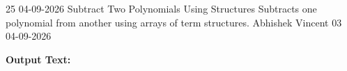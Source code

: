 \clearpage
\label{prog:25}
\programhead
  {25}
  {04-09-2026}
  {Subtract Two Polynomials Using Structures}
  {Subtracts one polynomial from another using arrays of term structures.}
  {Abhishek Vincent}
  {03}
  {04-09-2026}

\divider
\textbf{Output Text:}\par
\vspace{2pt}

